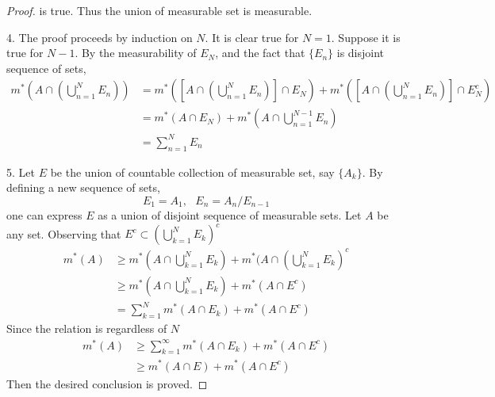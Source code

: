 \documentclass[lang=en, 12pt]{elegantbook}
\begin{document}
\begin{proof}
                is true. Thus the union of measurable set is measurable.\par
                4. The proof proceeds by induction on $N$. It is clear true for $N = 1$. Suppose it is true for $N-1$. By the measurability
            of $E_N$, and the fact that $\{E_n\}$ is disjoint sequence of sets, 
            \begin{equation*}
                \begin{aligned}
                m^*(A \cap (\bigcup_{n=1}^{N}E_n)) &= m^*( [A \cap (\bigcup_{n=1}^{N}E_n)] \cap E_N) + m^*([A \cap (\bigcup_{n=1}^{N}E_n)] \cap E_N^c)\\
                &= m^*(A \cap E_N) + m^*(A \cap \bigcup_{n=1}^{N-1}E_n) \\
                &= \sum_{n=1}^{N}E_n
                \end{aligned}
            \end{equation*}\par
                5. Let $E$ be the union of countable collection of measurable set, say $\{A_k\}$. By defining a new sequence of sets,
            $$ E_1 = A_1, \ \ \ E_n = A_n/E_{n-1} $$ 
            one can express $E$ as a union of disjoint sequence of measurable sets. Let $A$ be any set. Observing that $E^c \subset (\bigcup_{k=1}^N E_k)^c$
                \begin{equation*}
                    \begin{aligned}
                        m^*(A) &\geq m^*(A \cap \bigcup_{k=1}^N E_k) + m^*(A\cap (\bigcup_{k=1}^N E_k)^c\\
                               &\geq m^*(A\cap \bigcup_{k=1}^N E_k) + m^*(A\cap E^c)\\
                               &= \sum_{k=1}^N m^*(A\cap E_k) +m^*(A\cap E^c)
                    \end{aligned}
                \end{equation*}
                Since the relation is regardless of $N$
                \begin{equation*}
                    \begin{aligned}
                        m^*(A) &\geq \sum_{k=1}^{\infty} m^*(A\cap E_k) +m^*(A\cap E^c)\\
                            &\geq m^*(A\cap E) + m^*(A\cap E^c) 
                    \end{aligned}
                \end{equation*}
                Then the desired conclusion is proved.
            \end{proof}
\end{document}
